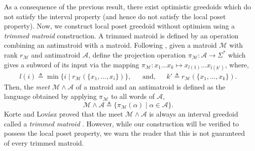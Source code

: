 \documentclass[11pt]{article}
\newcommand{\univ}{\Sigma}
\begin{document}
As a consequence of the previous result, there exist optimistic greedoids which do not satisfy the interval property (and hence do not satisfy the local poset property).
Now, we construct local poset greedoid without optimism using a \emph{trimmed matroid} construction.
A trimmed matroid is defined by an operation combining an antimatroid with a matroid.
Following \cite{korte1988intersection,korte2012greedoids}, given a matroid $\mathcal{M}$ with rank $r_\mathcal{M}$ and antimatroid $\mathcal{A}$, define the projection operation $\pi_\mathcal{M}:\mathcal{A}\to \univ^*$ which gives a subword of its input via the mapping $\pi_\mathcal{M}:x_1\ldots x_k \mapsto x_{l(1)} \ldots x_{l(k')}$,
where,
\begin{align*}
    l(i) \triangleq \min\big\{i\mid r_\mathcal{M}(\{x_1, \ldots, x_i\})\big\},&&\text{and},&& k'\triangleq r_\mathcal{M}(\{x_1, \ldots, x_k\}).
\end{align*}
Then, the \emph{meet} $\mathcal{M}\wedge \mathcal{A}$ of a matroid and an antimatroid is defined as the language obtained by applying $\pi_\mathcal{M}$ to all words of $\mathcal{A}$,
\[
    \mathcal{M}\wedge\mathcal{A}\triangleq \{\pi_\mathcal{M}(\alpha)\mid \alpha \in \mathcal{A}\}.
\]
Korte and Lovász proved that the meet $\mathcal{M}\wedge \mathcal{A}$ is always an interval greedoid called a \emph{trimmed matroid} \cite{korte1988intersection}.
However, while our construction will be verified to possess the local poset property, we warn the reader that this is not guaranteed of every trimmed matroid.
\end{document}
